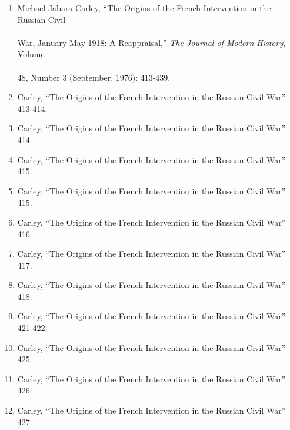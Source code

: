 \begin{enumerate}

  \item Michael Jabara Carley, “The Origins of the French Intervention in the Russian Civil 
    \vspace{-20pt}
    \paragraph{} War, January-May 1918: A Reappraisal,” \textit{The Journal of Modern History}, Volume
    \vspace{-20pt}
    \paragraph{} 48, Number 3 (September, 1976): 413-439.

  \item Carley, ``The Origins of the French Intervention in the Russian Civil War'' 413-414.
  \item Carley, ``The Origins of the French Intervention in the Russian Civil War'' 414.
  \item Carley, ``The Origins of the French Intervention in the Russian Civil War'' 415.
  \item Carley, ``The Origins of the French Intervention in the Russian Civil War'' 415.
  \item Carley, ``The Origins of the French Intervention in the Russian Civil War'' 416.
  \item Carley, ``The Origins of the French Intervention in the Russian Civil War'' 417.
  \item Carley, ``The Origins of the French Intervention in the Russian Civil War'' 418.
  \item Carley, ``The Origins of the French Intervention in the Russian Civil War'' 421-422.
  \item Carley, ``The Origins of the French Intervention in the Russian Civil War'' 425.
  \item Carley, ``The Origins of the French Intervention in the Russian Civil War'' 426.
  \item Carley, ``The Origins of the French Intervention in the Russian Civil War'' 427.

\end{enumerate}



